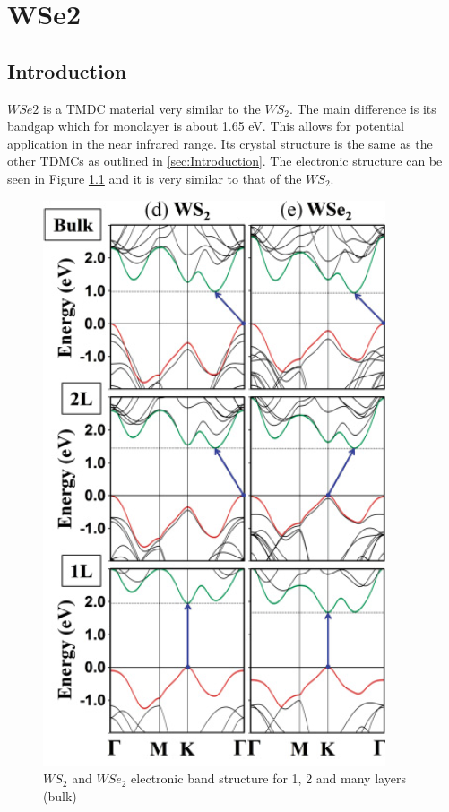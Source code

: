 \chapter{WSe2}

\section{Introduction}
	
		$WSe2$ is a TMDC material very similar to the $WS_2$. The main difference is its bandgap which for monolayer is about 1.65 eV. This allows for potential application in the near infrared range. Its crystal structure is the same as the other TDMCs as outlined in \ref{sec:Introduction}. The electronic structure can be seen in Figure \ref{fig:WSe2BandStructureWSe2WS2} and it is very similar to that of the $WS_2$. 
		
\begin{figure}[!h]
	\begin{center}
		\includegraphics[scale=0.5]{WSe2/WSe2BandStructureWSe2WS2.png}
		\caption{$WS_2$ and $WSe_2$ electronic band structure for 1, 2 and many layers (bulk)}
		\label{fig:WSe2BandStructureWSe2WS2}
	\end{center}
\end{figure}
	
